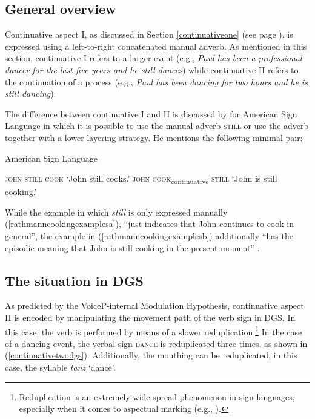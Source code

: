 \subsection{General overview}
Continuative aspect I, as discussed in Section \ref{continuativeone} (see page \pageref{continuativeone}), is expressed using a left-to-right concatenated manual adverb. As mentioned in this section, continuative I refers to a larger event (e.g., \textit{Paul has been a professional dancer for the last five years and he still dances}) while continuative II refers to the continuation of a process (e.g., \textit{Paul has been dancing for two hours and he is still dancing}).

The difference between continuative I and II is discussed by \citet[35]{rathmann2005event} for American Sign Language in which it is possible to use the manual adverb \textsc{still} or use the adverb together with a lower-layering strategy. He mentions the following minimal pair:

\begin{exe}
\ex American Sign Language \citep[35]{rathmann2005event}\label{rathmanncookingexamples}\begin{xlist}
\ex \textsc{john still cook}
\glt `John still cooks.' \label{rathmanncookingexamplesa}
\ex \textsc{john cook}\textsubscript{continuative} \textsc{still}
\glt `John is still cooking.' \label{rathmanncookingexamplesb}

\end{xlist}
\end{exe}

\noindent While the example in which \textit{still} is only expressed manually (\ref{rathmanncookingexamplesa}), ``just indicates that John continues to cook in general'', the example in (\ref{rathmanncookingexamplesb}) additionally ``has the episodic meaning that John is still cooking in the present moment'' \citep[35]{rathmann2005event}.

\subsection{The situation in DGS}
As predicted by the VoiceP-internal Modulation Hypothesis, continuative aspect II is encoded by manipulating the movement path of the verb sign in DGS. In this case, the verb is performed by means of a slower reduplication.\footnote{ Reduplication is an extremely wide-spread phenomenon in sign languages, especially when it comes to aspectual marking (e.g., \citealt{klima1979signs, wilbur2005reanalysis, wilbur2009productive}).} In the case of a dancing event, the verbal sign \textsc{dance} is reduplicated three times, as shown in (\ref{continuativetwodgs}). Additionally, the mouthing can be reduplicated, in this case, the syllable \textit{tanz} `dance'.


